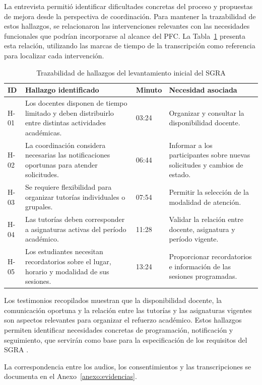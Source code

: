 La entrevista permitió identificar dificultades concretas del proceso y propuestas de mejora desde la perspectiva de coordinación. Para mantener la trazabilidad de estos hallazgos, se relacionaron las intervenciones relevantes con las necesidades funcionales que podrían incorporarse al alcance del PFC. La Tabla~\ref{tab:trazabilidad-contexto} presenta esta relación, utilizando las marcas de tiempo de la transcripción como referencia para localizar cada intervención.

\begin{table}[htbp]
\centering
\caption{Trazabilidad de hallazgos del levantamiento inicial del SGRA}
\label{tab:trazabilidad-contexto}
\small
\begin{tabularx}{\textwidth}{@{}p{}p{}p{}X@{}}
\toprule
\textbf{ID} &
\textbf{Hallazgo identificado} &
\textbf{Minuto} &
\textbf{Necesidad asociada} \\
\midrule

H-01 &
Los docentes disponen de tiempo limitado y deben distribuirlo entre distintas actividades académicas. &
03:24 &
Organizar y consultar la disponibilidad docente. \\

H-02 &
La coordinación considera necesarias las notificaciones oportunas para atender solicitudes. &
06:44 &
Informar a los participantes sobre nuevas solicitudes y cambios de estado. \\

H-03 &
Se requiere flexibilidad para organizar tutorías individuales o grupales. &
07:54 &
Permitir la selección de la modalidad de atención. \\

H-04 &
Las tutorías deben corresponder a asignaturas activas del período académico. &
11:28 &
Validar la relación entre docente, asignatura y período vigente. \\

H-05 &
Los estudiantes necesitan recordatorios sobre el lugar, horario y modalidad de sus sesiones. &
13:24 &
Proporcionar recordatorios e información de las sesiones programadas. \\

\bottomrule
\end{tabularx}
\end{table}

Los testimonios recopilados muestran que la disponibilidad docente, la comunicación oportuna y la relación entre las tutorías y las asignaturas vigentes son aspectos relevantes para organizar el refuerzo académico. Estos hallazgos permiten identificar necesidades concretas de programación, notificación y seguimiento, que servirán como base para la especificación de los requisitos del SGRA \cite{Ponce2025-Entrevista}.

La correspondencia entre los audios, los consentimientos y las transcripciones se documenta en el Anexo~\ref{anexo:evidencias}.
